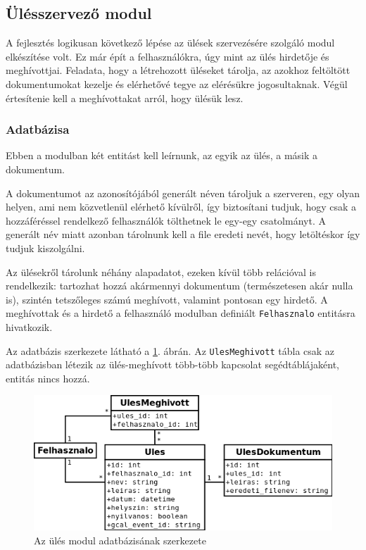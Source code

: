 \documentclass[a4paper,12pt,oneside]{report}
\begin{document}
\subsection{Ülésszervező modul}

A fejlesztés logikusan következő lépése az ülések szervezésére szolgáló modul elkészítése volt. Ez már épít a felhasználókra, úgy mint az ülés hirdetője és meghívottjai. Feladata, hogy a létrehozott üléseket tárolja, az azokhoz feltöltött dokumentumokat kezelje és elérhetővé tegye az elérésükre jogosultaknak. Végül értesítenie kell a meghívottakat arról, hogy ülésük lesz.

\subsubsection*{Adatbázisa}

Ebben a modulban két entitást kell leírnunk, az egyik az ülés, a másik a dokumentum.

A dokumentumot az azonosítójából generált néven tároljuk a szerveren, egy olyan helyen, ami nem közvetlenül elérhető kívülről, így biztosítani tudjuk, hogy csak a hozzáféréssel rendelkező felhasználók tölthetnek le egy-egy csatolmányt. A generált név miatt azonban tárolnunk kell a file eredeti nevét, hogy letöltéskor így tudjuk kiszolgálni.

Az ülésekről tárolunk néhány alapadatot, ezeken kívül több relációval is rendelkezik: tartozhat hozzá akármennyi dokumentum (természetesen akár nulla is), szintén tetszőleges számú meghívott, valamint pontosan egy hirdető. A meghívottak és a hirdető a felhasználó modulban definiált {\tt Felhasznalo} entitásra hivatkozik.

Az adatbázis szerkezete látható a \ref{fig:ules_db}. ábrán. Az {\tt UlesMeghivott} tábla csak az adatbázisban létezik az ülés-meghívott több-több kapcsolat segédtáblájaként, entitás nincs hozzá.

\begin{figure}[h]
    \includegraphics[width=\textwidth]{ules_db.png}
    \caption{Az ülés modul adatbázisának szerkezete}
    \label{fig:ules_db}
\end{figure}
\end{document}
